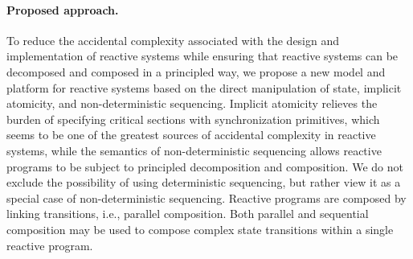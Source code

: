 
\paragraph{Proposed approach.}
To reduce the accidental complexity associated with the design and implementation of reactive systems while ensuring that reactive systems can be decomposed and composed in a principled way, we propose a new model and platform for reactive systems based on the direct manipulation of state, implicit atomicity, and non-deterministic sequencing.
Implicit atomicity relieves the burden of specifying critical sections with synchronization primitives, which seems to be one of the greatest sources of accidental complexity in reactive systems, while the semantics of non-deterministic sequencing allows reactive programs to be subject to principled decomposition and composition.
We do not exclude the possibility of using deterministic sequencing, but rather view it as a special case of non-deterministic sequencing.
Reactive programs are composed by linking transitions, i.e., parallel composition.
Both parallel and sequential composition may be used to compose complex state transitions within a single reactive program.


